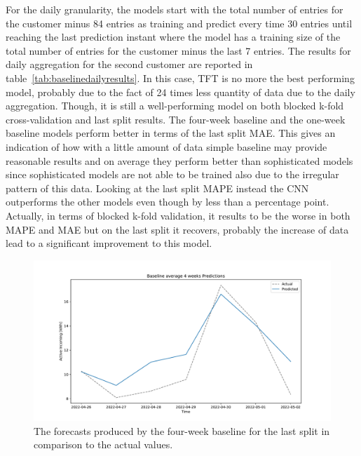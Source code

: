 For the daily granularity, the models start with the total number of entries for the customer minus 84 entries as training and predict every time 30 entries until reaching the last prediction instant where the model has a training size of the total number of entries for the customer minus the last 7 entries.
The results for daily aggregation for the second customer are reported in table~\ref{tab:baselinedailyresults}.
In this case, TFT is no more the best performing model, probably due to the fact of 24 times less quantity of data due to the daily aggregation.
Though, it is still a well-performing model on both blocked k-fold cross-validation and last split results.
The four-week baseline and the one-week baseline models perform better in terms of the last split MAE.
This gives an indication of how with a little amount of data simple baseline may provide reasonable results and on average they perform better than sophisticated models since sophisticated models are not able to be trained also due to the irregular pattern of this data.
Looking at the last split MAPE instead the CNN outperforms the other models even though by less than a percentage point.
Actually, in terms of blocked k-fold validation, it results to be the worse in both MAPE and MAE but on the last split it recovers, probably the increase of data lead to a significant improvement to this model.

\begin{figure}[H]
\centering
\includegraphics[width=1\textwidth]{images/baseline/baseline_average_4_weeks_daily_aggregated}
\caption{The forecasts produced by the four-week baseline for the last split in comparison to the actual values.}
\label{fig:baseline4weeksdailyforecasts}
\end{figure}

